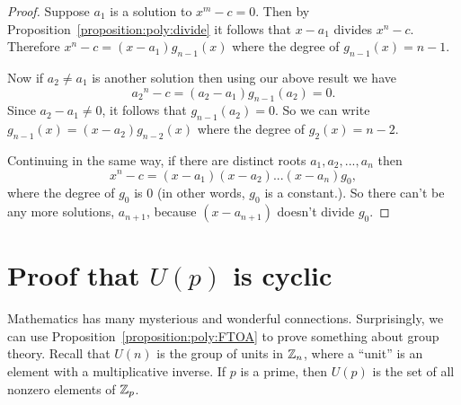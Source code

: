 \begin {proof}
Suppose $a_1$ is a solution to $x^m-c=0$. Then by Proposition~\ref{proposition:poly:divide} it follows that $x-a_1$ divides $x^n-c$. Therefore $x^n-c = (x-a_1) g_{n-1}(x)$ where the degree of $g_{n-1}(x)=n-1$. 

Now if $a_2 \neq a_1$ is another solution then using our above result we have
\[ {a_2}^n - c = (a_2 - a_1)g_{n-1}(a_2) = 0. \]
Since $a_2 - a_1 \neq 0$, it follows that $g_{n-1}(a_2) = 0$. So we can write $g_{n - 1}(x) = (x-a_2)g_{n-2}(x)$ where the degree of $g_2(x) = n-2$. 

Continuing in the same way, if there are distinct roots $a_1,a_2,...,a_n$ then 
\[
x^n - c = (x - a_1)(x - a_2)...(x - a_n)g_0,\]
 where the degree of $g_0$ is 0 (in other words, $g_0$ is a constant.). So there can't be any more solutions, $a_{n+1}$, because $(x-a_{n+1})$ doesn't divide $g_0$.
\end {proof}

\section{Proof that $U(p)$ is cyclic}

Mathematics has many mysterious and wonderful connections. Surprisingly, we can use Proposition~\ref{proposition:poly:FTOA} to prove something about group theory.  
Recall that $U(n)$ is the group of units in $\mathbb{Z}_n$, where a ``unit'' is an element with a multiplicative inverse. If $p$ is a prime, then $U(p)$ is the set of all nonzero elements of $\mathbb{Z}_p$. 

